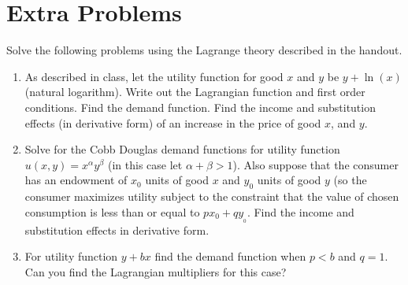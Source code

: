 \documentclass{article}
\begin{document}
\section{Extra Problems}

Solve the following problems using the Lagrange theory described in the handout.

\begin{enumerate}
\item  As described in class, let the utility function for good $x$ and $y$ be
$y+\ln\left(  x\right)  $ (natural logarithm). Write out the Lagrangian
function and first order conditions. Find the demand function. Find the income
and substitution effects (in derivative form) of an increase in the price of
good $x$, and $y$.

\item  Solve for the Cobb Douglas demand functions for utility function
$u\left(  x,y\right)  =x^{\alpha}y^{\beta}$ (in this case let $\alpha+\beta
>1$). Also suppose that the consumer has an endowment of $x_{0}$ units of good
$x$ and $y_{0}$ units of good $y$ (so the consumer maximizes utility subject
to the constraint that the value of chosen consumption is less than or equal
to $px_{0}+qy_{_{0}}$. Find the income and substitution effects in derivative form.

\item  For utility function $y+bx$ find the demand function when $p<b$ and
$q=1$. Can you find the Lagrangian multipliers for this case?
\end{enumerate}
\end{document}
